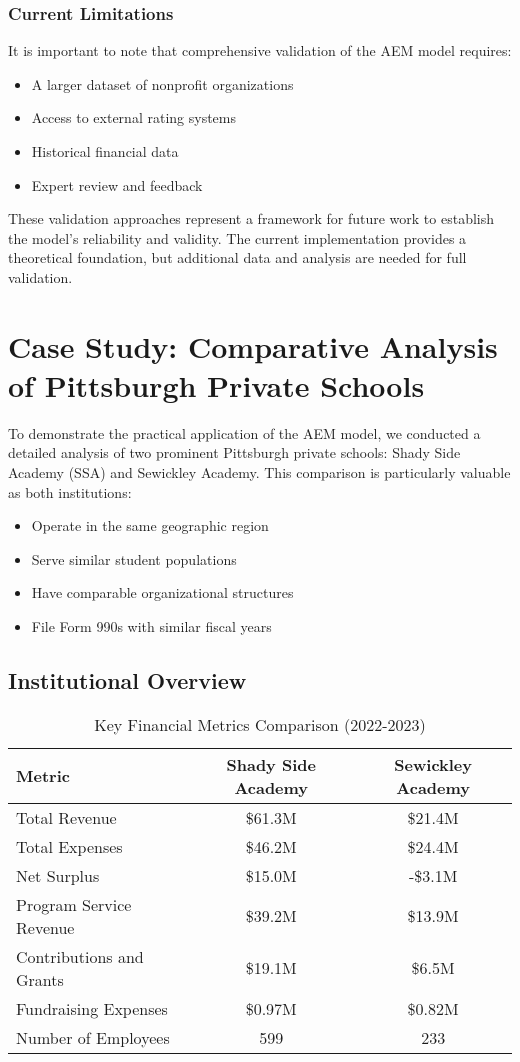 \documentclass[12pt]{article}
\begin{document}
\subsubsection{Current Limitations}
It is important to note that comprehensive validation of the AEM model requires:
\begin{itemize}
    \item A larger dataset of nonprofit organizations
    \item Access to external rating systems
    \item Historical financial data
    \item Expert review and feedback
\end{itemize}

These validation approaches represent a framework for future work to establish the model's reliability and validity. The current implementation provides a theoretical foundation, but additional data and analysis are needed for full validation.

\section{Case Study: Comparative Analysis of Pittsburgh Private Schools}

To demonstrate the practical application of the AEM model, we conducted a detailed analysis of two prominent Pittsburgh private schools: Shady Side Academy (SSA) and Sewickley Academy. This comparison is particularly valuable as both institutions:
\begin{itemize}
    \item Operate in the same geographic region
    \item Serve similar student populations
    \item Have comparable organizational structures
    \item File Form 990s with similar fiscal years
\end{itemize}

\subsection{Institutional Overview}

\begin{table}[H]
\centering
\begin{tabular}{|l|c|c|}
\hline
\textbf{Metric} & \textbf{Shady Side Academy} & \textbf{Sewickley Academy} \\
\hline
Total Revenue & \$61.3M & \$21.4M \\
Total Expenses & \$46.2M & \$24.4M \\
Net Surplus & \$15.0M & -\$3.1M \\
Program Service Revenue & \$39.2M & \$13.9M \\
Contributions and Grants & \$19.1M & \$6.5M \\
Fundraising Expenses & \$0.97M & \$0.82M \\
Number of Employees & 599 & 233 \\
\hline
\end{tabular}
\caption{Key Financial Metrics Comparison (2022-2023)}
\label{tab:school_comparison}
\end{table}
\end{document}
